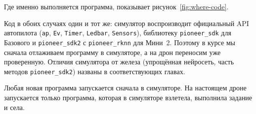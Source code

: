 Где именно выполняется программа, показывает рисунок~\ref{fig:where-code}.



Код в обоих случаях один и тот же: симулятор воспроизводит официальный API автопилота (\texttt{ap}, \texttt{Ev}, \texttt{Timer}, \texttt{Ledbar}, \texttt{Sensors}), библиотеку \texttt{pioneer\_sdk} для Базового и \texttt{pioneer\_sdk2} с \texttt{pioneer\_rknn} для Мини~2. Поэтому в курсе мы сначала отлаживаем программу в симуляторе, а на дрон переносим уже проверенную. Отличия симулятора от железа (упрощённая нейросеть, часть методов \texttt{pioneer\_sdk2}) названы в соответствующих главах.

\begin{rulebox}
Любая новая программа запускается сначала в симуляторе. На настоящем дроне запускается только программа, которая в симуляторе взлетела, выполнила задание и села.
\end{rulebox}
